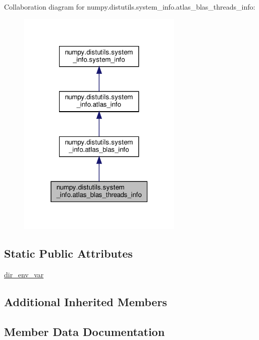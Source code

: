 Collaboration diagram for numpy.\+distutils.\+system\+\_\+info.\+atlas\+\_\+blas\+\_\+threads\+\_\+info\+:
\nopagebreak
\begin{figure}[H]
\begin{center}
\leavevmode
\includegraphics[width=223pt]{classnumpy_1_1distutils_1_1system__info_1_1atlas__blas__threads__info__coll__graph}
\end{center}
\end{figure}
\subsection*{Static Public Attributes}
\begin{DoxyCompactItemize}
\item 
\hyperlink{classnumpy_1_1distutils_1_1system__info_1_1atlas__blas__threads__info_a1e679a40010c7bb770667aad54ade82c}{dir\+\_\+env\+\_\+var}
\end{DoxyCompactItemize}
\subsection*{Additional Inherited Members}


\subsection{Member Data Documentation}
\mbox{\label{classnumpy_1_1distutils_1_1system__info_1_1atlas__blas__threads__info_a1e679a40010c7bb770667aad54ade82c}} 
